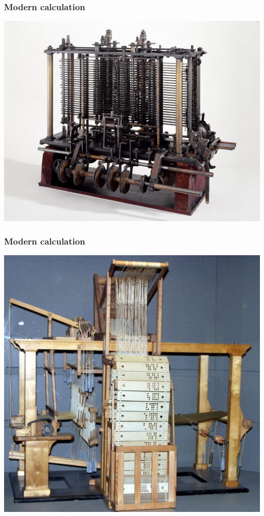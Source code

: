 \documentclass[11pt]{beamer}
\begin{document}
\begin{frame}[fragile]
  \frametitle{Modern calculation}

  \includegraphics[height=0.75\textheight]{./img/babbage-1.jpg}
\end{frame}

\begin{frame}[fragile]
  \frametitle{Modern calculation}

  \includegraphics[height=0.75\textheight]{./img/jacquard.jpg}
\end{frame}
\end{document}
